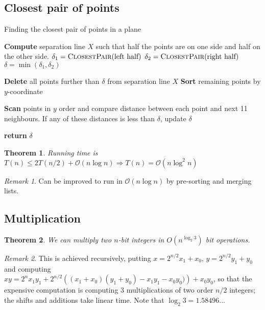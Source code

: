 \documentclass[10pt, oneside, reqno]{amsart}
\theoremstyle{plain}%
\newtheorem{thm}{Theorem}[section]
\theoremstyle{definition}
\theoremstyle{remark}
\newtheorem*{rem}{Remark}
\newcommand{\bigo}[1]{\mathcal{O}(#1)}
\begin{document}
\subsection{Closest pair of points} %
\label{sub:closest_pair_of_points}

\begin{algorithm}[H]
    \label{alg:dynamic_rising_trend}
    \caption{Finding the closest pair of points in a plane}
    \begin{algorithmic}[1]
            \State \textbf{Compute} separation line $X$ such that half the points are on one side and half on the other side.
            \State 
            \State $\delta_1 = \textsc{ClosestPair}(\text{left half})$
            \State $\delta_2 = \textsc{ClosestPair}(\text{right half})$
            \State $\delta = \min(\delta_1, \delta_2)$
            
            \State
            \State \textbf{Delete} all points further than $\delta$ from separation line $X$
            \State \textbf{Sort} remaining points by $y$-coordinate
            
            \State \textbf{Scan} points in $y$ order and compare distance between each point and next 11 neighbours.  If any of these distances is less than $\delta$, update $\delta$
            
            \State 
            \State \textbf{return} $\delta$
    \EndProcedure
    \end{algorithmic}
\end{algorithm}

\begin{thm}
    Running time is $T(n) \leq 2 T(n/2) + \bigo{n \log n} \Rightarrow T(n) = \bigo{n \log^2 n}$
\end{thm}


\begin{rem}
    Can be improved to run in $\bigo{n \log n}$ by pre-sorting and merging lists.
\end{rem}

\subsection{Multiplication} %
\begin{thm} We can multiply two $n$-bit integers in $O(n^{\log_2 3})$ bit operations.
\end{thm}
\begin{rem} This is achieved recursively, putting $x=2^{n/2}x_1+x_0$, $y=2^{n/2}y_1+y_0$ and computing $xy = 2^n x_1 y_1 + 2^{n/2} \left( (x_1+x_0)(y_1+y_0) - x_1y_1 - x_0y_0) \right) + x_0 y_0$, so that the expensive computation is computing $3$ multiplications of two order $n/2$ integers; the shifts and additions take linear time. Note that $\log_2 3 =1.58496...$
\end{rem}
\label{sub:multiplication}
\end{document}
